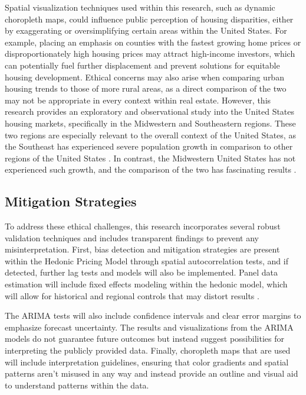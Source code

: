 \documentclass[journal,article,submit,pdftex,moreauthors]{Definitions/mdpi}
\begin{document}
Spatial visualization techniques used within this research, such as dynamic choropleth maps, could influence public perception of housing disparities, either by exaggerating or oversimplifying certain areas within the United States. For example, placing an emphasis on counties with the fastest growing home prices or disproportionately high housing prices may attract high-income investors, which can potentially fuel further displacement and prevent solutions for equitable housing development. Ethical concerns may also arise when comparing urban housing trends to those of more rural areas, as a direct comparison of the two may not be appropriate in every context within real estate. However, this research provides an exploratory and observational study into the United States housing markets, specifically in the Midwestern and Southeastern regions. These two regions are especially relevant to the overall context of the United States, as the Southeast has experienced severe population growth in comparison to other regions of the United States \citep{biernackalievestro_2023_southern}. In contrast, the Midwestern United States has not experienced such growth, and the comparison of the two has fascinating results \citep{maynard_2021_population}.

\subsection{Mitigation Strategies}

To address these ethical challenges, this research incorporates several robust validation techniques and includes transparent findings to prevent any misinterpretation. First, bias detection and mitigation strategies are present within the Hedonic Pricing Model through spatial autocorrelation tests, and if detected, further lag tests and models will also be implemented. Panel data estimation will include fixed effects modeling within the hedonic model, which will allow for historical and regional controls that may distort results \citep{torresreyna_2010_getting}. 

The ARIMA tests will also include confidence intervals and clear error margins to emphasize forecast uncertainty. The results and visualizations from the ARIMA models do not guarantee future outcomes but instead suggest possibilities for interpreting the publicly provided data. Finally, choropleth maps that are used will include interpretation guidelines, ensuring that color gradients and spatial patterns aren’t misused in any way and instead provide an outline and visual aid to understand patterns within the data.
\end{document}

